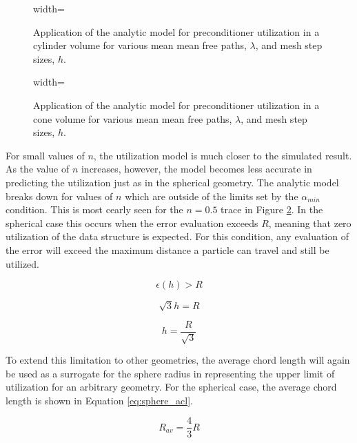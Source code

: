 \begin{figure}[H]
  \centering
  {width=\textwidth}
  \caption{Application of the analytic model for preconditioner utilization in a
    cylinder volume for various mean mean free paths, $\lambda$, and mesh step
    sizes, $h$.}
  \label{fig:sdf_util_sampled_cylinder}
\end{figure}


\begin{figure}[H]
  \centering
  {width=\textwidth}
  \caption{Application of the analytic model for preconditioner utilization in a
    cone volume for various mean mean free paths, $\lambda$, and mesh step
    sizes, $h$.}
  \label{fig:sdf_util_sampled_cone}
\end{figure}

For small values of $n$, the utilization model is much closer to the simulated
result. As the value of $n$ increases, however, the model becomes less accurate
in predicting the utilization just as in the spherical geometry. The analytic
model breaks down for values of $n$ which are outside of the limits set by the
$\alpha_{min}$ condition. This is most cearly seen for the $n = 0.5$ trace in
Figure \ref{fig:sdf_util_sampled_cone}. In the spherical case this occurs when
the error evaluation exceeds $R$, meaning that zero utilization of the data
structure is expected. For this condition, any evaluation of the error will
exceed the maximum distance a particle can travel and still be utilized.

\begin{equation}
  \epsilon(h) > R
\end{equation}

\begin{equation}
  \sqrt{3}h = R
\end{equation}

\begin{equation}
  h = \frac{R}{\sqrt{3}}
  \label{eq:error_condition_sphere}
\end{equation}

To extend this limitation to other geometries, the average chord length will
again be used as a surrogate for the sphere radius in representing the upper
limit of utilization for an arbitrary geometry. For the spherical case, the
average chord length is shown in Equation \ref{eq:sphere_acl}.

\begin{equation}
  R_{av} = \frac{4}{3}R
  \label{eq:sphere_acl}
\end{equation}

